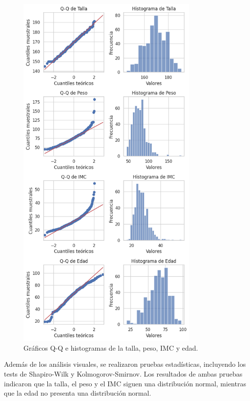 \begin{figure}[H]
	\centering
	\includegraphics[width=0.8\textwidth]{./Figures/qqplots2.png}
	\caption{Gráficos Q-Q e histogramas de la talla, peso, IMC y edad.}\label{fig:qqplots2}
\end{figure}

Además de los análisis visuales, se realizaron pruebas estadísticas, incluyendo los tests de Shapiro-Wilk 
y Kolmogorov-Smirnov. Los resultados de ambas pruebas indicaron que la talla, el peso y el IMC siguen una 
distribución normal, mientras que la edad no presenta una distribución normal.

